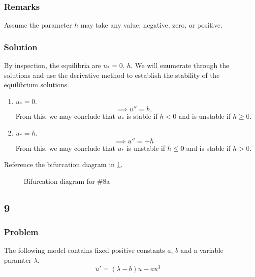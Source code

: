 \documentclass[12pt,twoside]{article}
\begin{document}
\subsubsection*{Remarks}
Assume the parameter $h$ may take any value: negative, zero, or positive.

\subsubsection*{Solution}
By inspection, the equilibria are $u_*=0,\,h$. We will enumerate through the
solutions and use the derivative method to establish the stability of the
equilibrium solutions.
\begin{enumerate}
\item $u_*=0$.
  $$\implies u''=h.$$ From this, we may conclude that $u_*$ is stable if $h<0$
  and is unstable if $h\ge0$.
\item $u_*=h$.
  $$\implies u''=-h$$ From this, we may conclude that $u_*$ is unstable if $h\le0$
  and is stable if $h>0$.
\end{enumerate}
Reference the bifurcation diagram in \cref{fig:8-bifurcation-diagram}.

\begin{figure}
  \centering
  \caption{Bifurcation diagram for \#8a}
  \label{fig:8-bifurcation-diagram}
\end{figure}

\subsection{9}
\subsubsection*{Problem}
The following model contains fixed positive constants $a$, $b$ and a variable paramter $\lambda$.
\begin{equation*}
  u'=(\lambda - b) u-au^3
\end{equation*}
\end{document}
